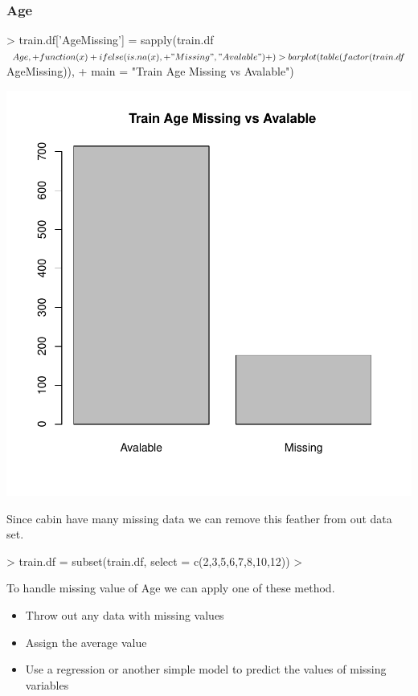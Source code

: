 \documentclass[12pt]{article}
\begin{document}
\subsubsection*{Age}
\begin{Schunk}
\begin{Sinput}
> train.df['AgeMissing'] =  sapply(train.df$Age, 
+                                  function(x) 
+                                   ifelse(is.na(x),
+                                     "Missing","Avalable")
+                                  )
> barplot(table(factor(train.df$AgeMissing)), 
+         main = "Train Age Missing vs Avalable")
\end{Sinput}
\end{Schunk}
\includegraphics{Example-005}

Since cabin have many missing data we can remove this feather from out data set.

\begin{Schunk}
\begin{Sinput}
> train.df  = subset(train.df, select = c(2,3,5,6,7,8,10,12))
> 
\end{Sinput}
\end{Schunk}

To handle missing value of Age we can apply one of these method.
\begin{itemize}
  \item Throw out any data with missing values
  \item Assign the average value
  \item Use a regression or another simple model to predict the values of missing variables
\end{itemize}
\end{document}
